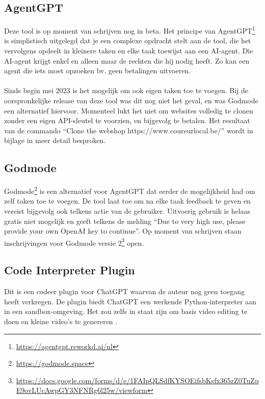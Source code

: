 \subsection{AgentGPT} 
Deze tool is op moment van schrijven nog in beta. Het principe van AgentGPT\footnote{\href{https://agentgpt.reworkd.ai/nl}{https://agentgpt.reworkd.ai/nl}} is simplistisch uitgelegd dat je een complexe opdracht stelt aan de tool, die het vervolgens opdeelt in kleinere taken en elke taak toewijst aan een AI-agent. Die AI-agent krijgt enkel en alleen maar de rechten die hij nodig heeft. Zo kan een agent die iets moet opzoeken bv. geen betalingen uitvoeren. 
\\\\
Sinds begin mei 2023 is het mogelijk om ook eigen taken toe te voegen. Bij de oorspronkelijke release van deze tool was dit nog niet het geval, en was Godmode een alternatief hiervoor. Momenteel lukt het niet om websites volledig te clonen zonder een eigen API-sleutel te voorzien, en bijgevolg te betalen. Het resultaat van de commando “Clone the webshop https://www.coureurlocal.be/” wordt in bijlage in meer detail besproken.

\subsection{Godmode}
Godmode\footnote{\href{https://godmode.space}{https://godmode.space}} is een alternatief voor AgentGPT dat eerder de mogelijkheid had om zelf taken toe te voegen. De tool laat toe om na elke taak feedback te geven en vereist bijgevolg ook telkens actie van de gebruiker. Uitvoerig gebruik is helaas gratis niet mogelijk en geeft telkens de melding “Due to very high use, please provide your own OpenAI key to continue”. Op moment van schrijven staan inschrijvingen voor Godmode versie 2\footnote{ \href{https://docs.google.com/forms/d/e/1FAIpQLSdfKYSOEifsbKsfx365zZ0TuZpE9ovLUcAwpGY3NFNRg6l25w/viewform}{https://docs.google.com/forms/d/e/1FAIpQLSdfKYSOEifsbKsfx365zZ0TuZpE9ovLUcAwpGY3NFNRg6l25w/viewform}} open.
\subsection{Code Interpreter Plugin}
Dit is een codeer plugin voor ChatGPT waarvan de auteur nog geen toegang heeft verkregen. De plugin biedt ChatGPT een werkende Python-interpreter aan in een sandbox-omgeving. Het zou zelfs in staat zijn om basis video editing te doen en kleine video's te genereren \autocite{Jose2023}.
